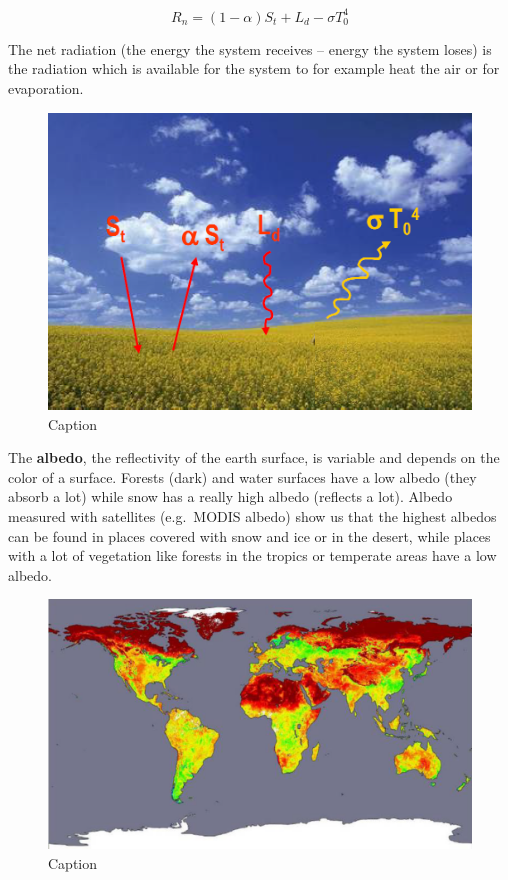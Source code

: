 \documentclass[12pt,oneside]{book}
\begin{document}
\begin{equation} 
  R_n = (1 - \alpha)S_t + L_d - \sigma T_0^{4}
  \label{eq:EqNetRadiation}
\end{equation}

The net radiation (the energy the system receives -- energy the system
loses) is the radiation which is available for the system to for example
heat the air or for evaporation.

\begin{figure}

{\centering \includegraphics[width=0.5\linewidth]{figures/Figure134} 

}

\caption{Caption}\label{fig:RadiationAlbedo}
\end{figure}

The \textbf{albedo}, the reflectivity of the earth surface, is variable
and depends on the color of a surface. Forests (dark) and water surfaces
have a low albedo (they absorb a lot) while snow has a really high
albedo (reflects a lot). Albedo measured with satellites (e.g.~MODIS
albedo) show us that the highest albedos can be found in places covered
with snow and ice or in the desert, while places with a lot of
vegetation like forests in the tropics or temperate areas have a low
albedo.

\begin{figure}

{\centering \includegraphics[width=0.5\linewidth]{figures/Figure135} 

}

\caption{Caption}\label{fig:albedo}
\end{figure}
\end{document}
